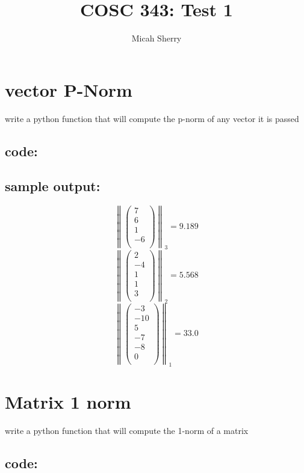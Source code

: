 \documentclass{article}
\title{COSC 343: Test 1}
\author{Micah Sherry}
\begin{document}
\maketitle

\section{vector P-Norm}
	write a python function that will compute the p-norm of any vector it is passed 
	\subsection*{code:}
	
	\subsection*{sample output:}
	$$ \left\| \begin{pmatrix}7 \\6 \\1 \\-6 \\\end{pmatrix}\right\|_{3} = 9.189$$
	$$ \left\| \begin{pmatrix}2 \\-4 \\1 \\1 \\3 \\\end{pmatrix}\right\|_{2} = 5.568$$
	$$ \left\| \begin{pmatrix}-3 \\-10 \\5 \\-7 \\-8 \\0 \\\end{pmatrix}\right\|_{1} = 33.0$$
\section{Matrix 1 norm}
	write a python function that will compute the 1-norm of a matrix
	\subsection*{code:}
	
\end{document}
